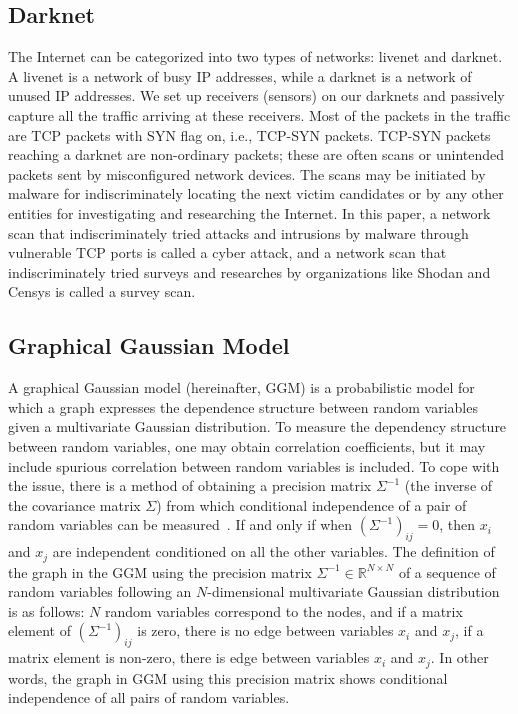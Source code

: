 \documentclass[conference]{IEEEtran}
\begin{document}
\subsection{Darknet}
The Internet can be categorized into two types of networks: livenet and darknet.
A livenet is a network of busy IP addresses, while a darknet is a network of unused IP addresses.
We set up receivers (sensors) on our darknets and passively capture all the traffic arriving at these receivers.
Most of the packets in the traffic are TCP packets with SYN flag on, i.e., TCP-SYN packets.
TCP-SYN packets reaching a darknet are non-ordinary packets; these are often scans or unintended packets sent by misconfigured network devices.
The scans may be initiated by malware for indiscriminately locating the next victim candidates or by any other entities for investigating and researching the Internet.
In this paper, a network scan that indiscriminately tried attacks and intrusions by malware through vulnerable TCP ports is called a cyber attack, and a network scan that indiscriminately tried surveys and researches by organizations like Shodan and Censys is called a survey scan.



\subsection{Graphical Gaussian Model}
A graphical Gaussian model (hereinafter, GGM) is a probabilistic model for which a graph expresses the dependence structure between random variables given a multivariate Gaussian distribution.
To measure the dependency structure between random variables, one may obtain correlation coefficients, but it may include spurious correlation between random variables is included.
To cope with the issue, there is a method of obtaining a precision matrix $\Sigma^{-1}$ (the inverse of the covariance matrix $\Sigma$) from which conditional independence of a pair of random variables can be measured~\cite{Ide}.
If and only if when $(\Sigma^{-1})_{ij}=0$, then $x_ {i}$ and $x_ {j}$ are independent conditioned on all the other variables.
The definition of the graph in the GGM using the precision matrix $\Sigma^{-1}\in\mathbb{R}^{N \times N}$ of a sequence of random variables following an $N$-dimensional multivariate Gaussian distribution is as follows: $N$ random variables correspond to the nodes, and if a matrix element of $(\Sigma^{-1})_{ij}$ is zero, there is no edge between variables $x_i$ and $x_j$, if a matrix element is non-zero, there is edge between variables $x_i$ and $x_j$.
In other words, the graph in GGM using this precision matrix shows conditional independence of all pairs of random variables.
\end{document}
